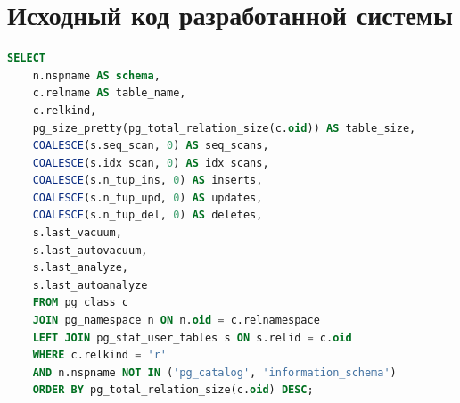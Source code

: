 \chapter{Исходный код разработанной системы}\label{appendix1}							%

\begin{lstlisting}[language=SQL,
	caption={SQL-запрос для анализа таблиц},
	label={lst:tables_info}]
	SELECT 
	n.nspname AS schema, 
	c.relname AS table_name, 
	c.relkind, 
	pg_size_pretty(pg_total_relation_size(c.oid)) AS table_size, 
	COALESCE(s.seq_scan, 0) AS seq_scans, 
	COALESCE(s.idx_scan, 0) AS idx_scans, 
	COALESCE(s.n_tup_ins, 0) AS inserts, 
	COALESCE(s.n_tup_upd, 0) AS updates, 
	COALESCE(s.n_tup_del, 0) AS deletes, 
	s.last_vacuum, 
	s.last_autovacuum, 
	s.last_analyze, 
	s.last_autoanalyze 
	FROM pg_class c 
	JOIN pg_namespace n ON n.oid = c.relnamespace 
	LEFT JOIN pg_stat_user_tables s ON s.relid = c.oid 
	WHERE c.relkind = 'r' 
	AND n.nspname NOT IN ('pg_catalog', 'information_schema') 
	ORDER BY pg_total_relation_size(c.oid) DESC; 
\end{lstlisting}

